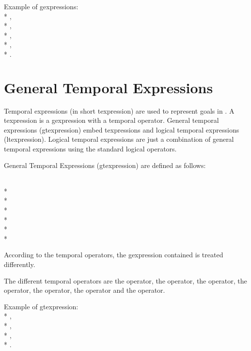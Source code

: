 Example of gexpressions: \\*
,\\*
,\\*
,\\*
,\\*
.

\section{General Temporal Expressions}


Temporal expressions (in short texpression) are used to represent goals in
\COPRS{}. A texpression is a gexpression with a temporal operator. General
temporal expressions (gtexpression) embed texpressions and logical temporal
expressions (ltexpression). Logical temporal expressions are just a combination
of general temporal expressions using the standard logical operators.

General Temporal Expressions (gtexpression) are defined as follows:

\noindent
{} \\*
 \\*
 \\*
\\*
\\*
\\*

According to the temporal operators, the gexpression contained is treated
differently.

The different temporal operators are the  operator, the 
operator, the  operator, the  operator, the
 operator, the  operator and the
 operator.

Example of gtexpression:\\*
,\\*
,\\*
,\\*
.

